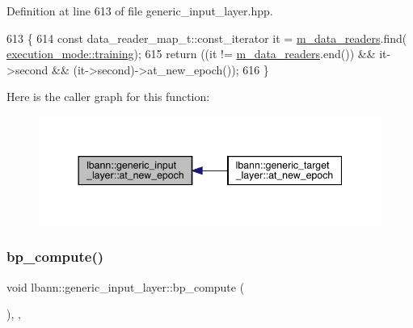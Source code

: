 Definition at line 613 of file generic\+\_\+input\+\_\+layer.\+hpp.


\begin{DoxyCode}
613                                      \{
614     \textcolor{keyword}{const} data\_reader\_map\_t::const\_iterator it = \hyperlink{classlbann_1_1generic__input__layer_a6bc18860c02beed0252ea3cc87bc48d2}{m\_data\_readers}.find(
      \hyperlink{base_8hpp_a2781a159088df64ed7d47cc91c4dc0a8ac185ddac8b5a8f5aa23c5b80bc12d214}{execution\_mode::training});
615     \textcolor{keywordflow}{return} ((it != \hyperlink{classlbann_1_1generic__input__layer_a6bc18860c02beed0252ea3cc87bc48d2}{m\_data\_readers}.end()) && it->second && (it->second)->at\_new\_epoch());
616   \}
\end{DoxyCode}
Here is the caller graph for this function\+:\nopagebreak
\begin{figure}[H]
\begin{center}
\leavevmode
\includegraphics[width=344pt]{classlbann_1_1generic__input__layer_a8b375ab97f38166872e4aa9baeca0715_icgraph}
\end{center}
\end{figure}
\mbox{\label{classlbann_1_1generic__input__layer_a36787a3caf2ef236747c6150edad82ea}} 
\subsubsection{\texorpdfstring{bp\+\_\+compute()}{bp\_compute()}}
{\footnotesize\ttfamily void lbann\+::generic\+\_\+input\+\_\+layer\+::bp\+\_\+compute (\begin{DoxyParamCaption}{ }\end{DoxyParamCaption})\hspace{0.3cm}{\ttfamily [inline]}, {\ttfamily [override]}, {\ttfamily [virtual]}}

